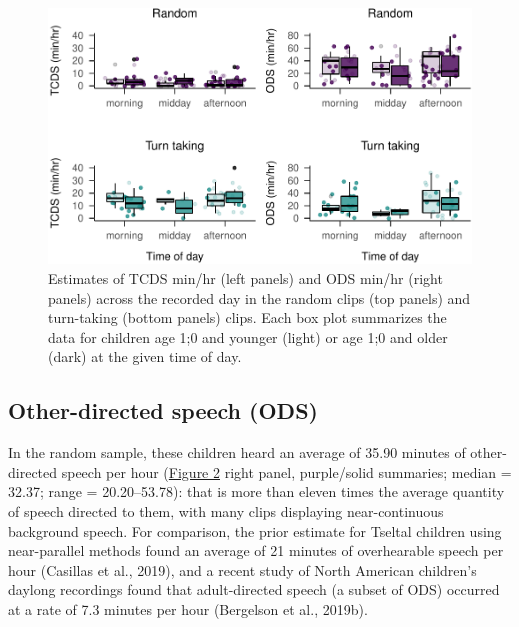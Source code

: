 \documentclass[,man,floatsintext]{apa6}
\begin{document}
\begin{figure}
\centering
\includegraphics{Yeli-CLE_files/figure-latex/fig3-1.pdf}
\caption{\label{fig:fig3}Estimates of TCDS min/hr (left panels) and ODS
min/hr (right panels) across the recorded day in the random clips (top
panels) and turn-taking (bottom panels) clips. Each box plot summarizes
the data for children age 1;0 and younger (light) or age 1;0 and older
(dark) at the given time of day.}
\end{figure}

\subsection{Other-directed speech
(ODS)}\label{other-directed-speech-ods}

In the random sample, these children heard an average of 35.90 minutes
of other-directed speech per hour (\protect\hyperlink{fig2}{Figure 2}
right panel, purple/solid summaries; median = 32.37; range =
20.20--53.78): that is more than eleven times the average quantity of
speech directed to them, with many clips displaying near-continuous
background speech. For comparison, the prior estimate for Tseltal
children using near-parallel methods found an average of 21 minutes of
overhearable speech per hour (Casillas et al., 2019), and a recent study
of North American children's daylong recordings found that
adult-directed speech (a subset of ODS) occurred at a rate of 7.3
minutes per hour (Bergelson et al., 2019b).
\end{document}
